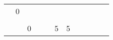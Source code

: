 \documentclass[12pt]{article}
\begin{document}
\begin{table}[]
{\begin{tabular}{clllllllllllllllllllllllllllllll}
\multicolumn{1}{|c|}{}                      & \multicolumn{4}{l|}{\multirow{-4}{*}{\cellcolor[HTML]{9AFF99}0}}                                               & \multicolumn{7}{l|}{\cellcolor[HTML]{9AFF99}}                                                                                                                         & \multicolumn{1}{l|}{} & \multicolumn{1}{l|}{} & \multicolumn{8}{l|}{\cellcolor[HTML]{FD6864}}                                                                                                                                                 & \multicolumn{1}{l|}{} & \multicolumn{1}{l|}{} & \multicolumn{1}{l|}{} & \multicolumn{1}{l|}{} & \multicolumn{1}{l|}{}            & \multicolumn{5}{l|}{\cellcolor[HTML]{CBCEFB}}                                                               \\ \cline{1-5} \cline{13-14} \cline{23-27}
\multicolumn{5}{|c|}{\cellcolor[HTML]{96FFFB}}                                                                                                               & \multicolumn{7}{l|}{\cellcolor[HTML]{9AFF99}}                                                                                                                         & \multicolumn{1}{l|}{} & \multicolumn{1}{l|}{} & \multicolumn{8}{l|}{\cellcolor[HTML]{FD6864}}                                                                                                                                                 & \multicolumn{1}{l|}{} & \multicolumn{1}{l|}{} & \multicolumn{1}{l|}{} & \multicolumn{1}{l|}{} & \multicolumn{1}{l|}{}            & \multicolumn{5}{l|}{\cellcolor[HTML]{CBCEFB}}                                                               \\ \cline{13-14} \cline{23-27}
\multicolumn{5}{|c|}{\cellcolor[HTML]{96FFFB}}                                                                                                               & \multicolumn{7}{l|}{\multirow{-9}{*}{\cellcolor[HTML]{9AFF99}0}}                                                                                                      & \multicolumn{1}{l|}{} & \multicolumn{1}{l|}{} & \multicolumn{8}{l|}{\multirow{-4}{*}{\cellcolor[HTML]{FD6864}5}}                                                                                                                              & \multicolumn{4}{l|}{\cellcolor[HTML]{FD6864}5}                                                & \multicolumn{1}{l|}{}            & \multicolumn{5}{l|}{\cellcolor[HTML]{CBCEFB}}                                                               \\ \cline{6-27}

\end{tabular}}
\end{table}
\end{document}
